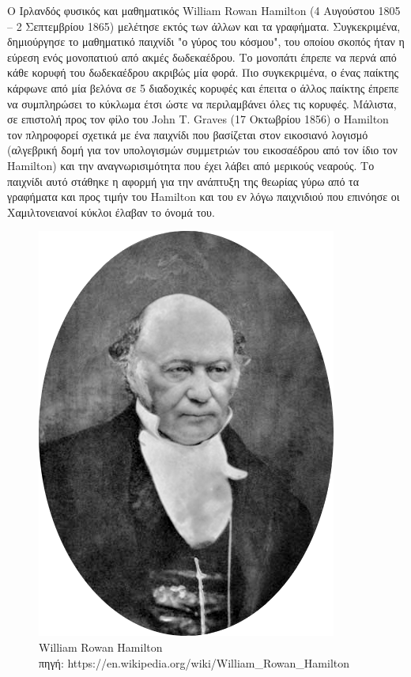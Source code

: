 \documentclass[oneside,12pt]{book}
\newenvironment{matlab}
	{\begin{figure}[hp]\centering\captionsetup{justification=centering}}
	{\end{figure}}
\theoremstyle{definition}
\begin{document}
O Ιρλανδός φυσικός και μαθηματικός William Rowan Hamilton (4 Αυγούστου 1805 – 2 Σεπτεμβρίου 1865) μελέτησε εκτός των άλλων και τα γραφήματα. Συγκεκριμένα, δημιούργησε το μαθηματικό παιχνίδι "ο γύρος του κόσμου", του οποίου σκοπός ήταν η εύρεση ενός μονοπατιού από ακμές δωδεκαέδρου. Το μονοπάτι έπρεπε να περνά από κάθε κορυφή του δωδεκαέδρου ακριβώς μία φορά. Πιο συγκεκριμένα, ο ένας παίκτης κάρφωνε από μία βελόνα σε 5 διαδοχικές κορυφές και έπειτα ο άλλος παίκτης έπρεπε να συμπληρώσει το κύκλωμα έτσι ώστε να περιλαμβάνει όλες τις κορυφές. Μάλιστα, σε επιστολή προς τον φίλο του John T. Graves (17 Οκτωβρίου 1856) ο Hamilton τον πληροφορεί σχετικά με ένα παιχνίδι που βασίζεται στον εικοσιανό λογισμό (αλγεβρική δομή για τον υπολογισμών συμμετριών του εικοσαέδρου από τον ίδιο τον Hamilton) και την αναγνωρισιμότητα που έχει λάβει από μερικούς νεαρούς. Το παιχνίδι αυτό στάθηκε η αφορμή για την ανάπτυξη της θεωρίας γύρω από τα γραφήματα και προς τιμήν του Hamilton και του εν λόγω παιχνιδιού που επινόησε οι Χαμιλτονειανοί κύκλοι έλαβαν το όνομά του. \\

\begin{matlab}
	\includegraphics[scale=0.2]{images/Hamilton.png}
	\caption{William Rowan Hamilton \\ πηγή: https://en.wikipedia.org/wiki/William\_Rowan\_Hamilton}
\end{matlab}  
\end{document}
